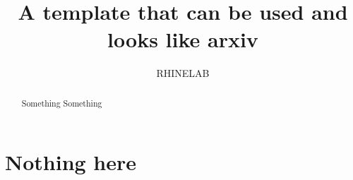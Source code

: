 \documentclass[10pt]{article}
\title{A template that can be used and looks like arxiv}
\author{
  RHINELAB
}
\date{}
\begin{document}
\maketitle

\begin{abstract}
Something Something
\end{abstract}






\clearpage

\appendix

\section{Nothing here}
\end{document}

